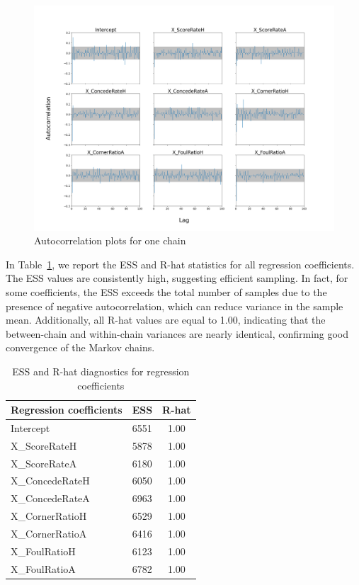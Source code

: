 \documentclass[9pt]{IEEEtran}
\begin{document}
\begin{figure}[h]
\centering
\includegraphics[width=1\columnwidth]{figures/autocorr.png}
\caption{Autocorrelation plots for one chain}
\label{fig:autocorr}
\end{figure}

In Table~\ref{tab:ess_rhat}, we report the ESS and R-hat statistics 
for all regression coefficients. The ESS values are consistently high, 
suggesting efficient sampling. In fact, for some coefficients, the 
ESS exceeds the total number of samples due to the presence of 
negative autocorrelation, which can reduce variance in the sample mean. 
Additionally, all R-hat values are equal to 1.00, indicating that the
 between-chain and within-chain variances are nearly identical, 
 confirming good convergence of the Markov chains.

\begin{table}[ht]
\centering
\begin{tabular}{l|c|c}
\textbf{Regression coefficients} & \textbf{ESS} & \textbf{R-hat} \\
\hline
Intercept        & 6551 & 1.00 \\
X\_ScoreRateH    & 5878 & 1.00 \\
X\_ScoreRateA    & 6180 & 1.00 \\
X\_ConcedeRateH  & 6050 & 1.00 \\
X\_ConcedeRateA  & 6963 & 1.00 \\
X\_CornerRatioH  & 6529 & 1.00 \\
X\_CornerRatioA  & 6416 & 1.00 \\
X\_FoulRatioH    & 6123 & 1.00 \\
X\_FoulRatioA    & 6782 & 1.00 \\
\end{tabular}
\caption{ESS and R-hat diagnostics for regression coefficients}
\label{tab:ess_rhat}
\end{table}
\vspace{-20pt}
\end{document}
